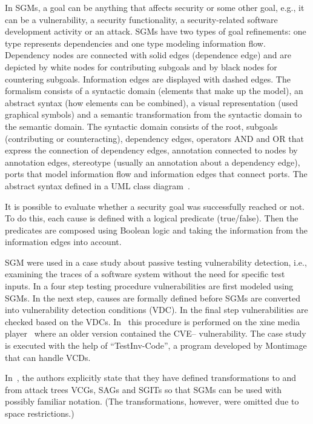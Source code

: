 \documentclass[a4paper]{article}
\begin{document}
In SGMs, a goal can be anything that affects security or some other goal, e.g.,
it can be a vulnerability, a security functionality, a security-related software
development activity or an attack. SGMs have two types of goal refinements: one
type represents dependencies and one type modeling information flow. Dependency
nodes are connected with solid edges (dependence edge) and are depicted by white
nodes for contributing subgoals and by black nodes for countering subgoals.
Information edges are displayed with dashed edges. The formalism consists of a
syntactic domain (elements that make up the model), an abstract syntax (how
elements can be combined), a visual representation (used graphical symbols) and
a semantic transformation from the syntactic domain to the semantic domain. The
syntactic domain consists of the root, subgoals (contributing or counteracting),
dependency edges, operators AND and OR that express the connection of dependency
edges, annotation connected to nodes by annotation edges, stereotype (usually an
annotation about a dependency edge), ports that model information flow and
information edges that connect ports. The abstract syntax defined in a UML class
diagram~\cite{ShMaOcByCaArJi}.

It is possible to evaluate whether a security goal was successfully reached or
not. To do this, each cause is defined with a logical predicate (true/false).
Then the predicates are composed using Boolean logic and taking the
information from the information edges into account.

SGM were used in a case study about passive testing vulnerability detection,
i.e., examining the traces of a software system without the need for specific
test inputs. In a four step testing procedure vulnerabilities are first modeled
using SGMs. In the next step, causes are formally defined before SGMs are
converted into vulnerability detection conditions (VDC). In the final step
vulnerabilities are checked based on the VDCs. In~\cite{ShMaOcByCaArJi} this
procedure is performed on the xine media player~\cite{Website_xine} where an
older version contained the CVE-- vulnerability. The case study is
executed with the help of ``TestInv-Code'', a program developed by Montimage
that can handle VCDs.

In~\cite{BySh}, the authors explicitly state that they have defined
transformations to and from attack trees VCGs, SAGs and SGITs so that SGMs can
be used with possibly familiar notation. (The transformations, however, were
omitted due to space restrictions.)
\end{document}
